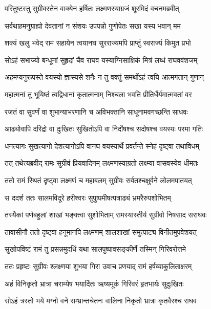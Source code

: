 
\twolineshloka
{परितुष्टस्तु सुग्रीवस्तेन वाक्येन हर्षितः}
{लक्ष्मणस्याग्रजं शूरमिदं वचनमब्रवीत्} %

\twolineshloka
{सर्वथाहमनुग्राह्यो देवतानां न संशयः}
{उपपन्नो गुणोपेतः सखा यस्य भवान् मम} %

\twolineshloka
{शक्यं खलु भवेद् राम सहायेन त्वयानघ}
{सुरराज्यमपि प्राप्तुं स्वराज्यं किमुत प्रभो} %

\twolineshloka
{सोऽहं सभाज्यो बन्धूनां सुहृदां चैव राघव}
{यस्याग्निसाक्षिकं मित्रं लब्धं राघववंशजम्} %

\twolineshloka
{अहमप्यनुरूपस्ते वयस्यो ज्ञास्यसे शनैः}
{न तु वक्तुं समर्थोऽहं त्वयि आत्मगतान् गुणान्} %

\twolineshloka
{महात्मनां तु भूयिष्ठं त्वद्विधानां कृतात्मनाम्}
{निश्चला भवति प्रीतिर्धैर्यमात्मवतां वर} %

\twolineshloka
{रजतं वा सुवर्णं वा शुभान्याभरणानि च}
{अविभक्तानि साधूनामवगच्छन्ति साधवः} %

\twolineshloka
{आढ्योवापि दरिद्रो वा दुःखितः सुखितोऽपि वा}
{निर्दोषश्च सदोषश्च वयस्यः परमा गतिः} %

\twolineshloka
{धनत्यागः सुखत्यागो देशत्यागोऽपि वानघ}
{वयस्यार्थे प्रवर्तन्ते स्नेहं दृष्ट्वा तथाविधम्} %

\twolineshloka
{तत् तथेत्यब्रवीद् रामः सुग्रीवं प्रियवादिनम्}
{लक्ष्मणस्याग्रतो लक्ष्म्या वासवस्येव धीमतः} %

\twolineshloka
{ततो रामं स्थितं दृष्ट्वा लक्ष्मणं च महाबलम्}
{सुग्रीवः सर्वतश्चक्षुर्वने लोलमपातयत्} %

\twolineshloka
{स ददर्श ततः सालमविदूरे हरीश्वरः}
{सुपुष्पमीषत्पत्राढ्यं भ्रमरैरुपशोभितम्} %

\twolineshloka
{तस्यैकां पर्णबहुलां शाखां भङ्क्त्वा सुशोभिताम्}
{रामस्यास्तीर्य सुग्रीवो निषसाद सराघवः} %

\twolineshloka
{तावासीनौ ततो दृष्ट्वा हनूमानपि लक्ष्मणम्}
{शालशाखां समुत्पाट्य विनीतमुपवेशयत्} %

\twolineshloka
{सुखोपविष्टं रामं तु प्रसन्नमुदधिं यथा}
{सालपुष्पावसङ्कीर्णे तस्मिन् गिरिवरोत्तमे} %

\twolineshloka
{ततः प्रहृष्टः सुग्रीवः श्लक्ष्णया शुभया गिरा}
{उवाच प्रणयाद् रामं हर्षव्याकुलिताक्षरम्} %

\twolineshloka
{अहं विनिकृतो भ्रात्रा चराम्येष भयार्दितः}
{ऋष्यमूकं गिरिवरं हृतभार्यः सुदुःखितः} %

\twolineshloka
{सोऽहं त्रस्तो भये मग्नो वने सम्भ्रान्तचेतनः}
{वालिना निकृतो भ्रात्रा कृतवैरश्च राघव} %

